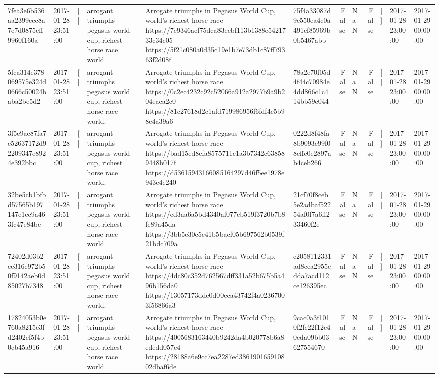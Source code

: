 \begin{tabular}{llllllrlrlll}
7fea3e6b536aa2399ccc8a7e7d0875cff9960f160a & 2017-01-28 23:51:00 & [] & arrogant triumphs pegasus world cup, richest horse race world. & Arrogate triumphs in Pegasus World Cup, world's richest horse race https://7e9346acf75dca83ecbf113b1388e5421733c34c05 https://5f21c080a0d35c19e1b7e73db1c87ff79363f2d08f & 75f4a33087d9e550ea4c0a491cf85969b0b5467abb & False & NaN & False & [] & 2017-01-28 23:00:00 & 2017-01-29 00:00:00 \\
5fca314e378069575e324d0666c50024baba2be5d2 & 2017-01-28 23:51:00 & [] & arrogant triumphs pegasus world cup, richest horse race world. & Arrogate triumphs in Pegasus World Cup, world's richest horse race https://0c2ec4232c92c52066a912a2977b9a9b204eaca2c0 https://81c27618d2c1afd719986956f6fdf4e5b98e4a39a6 & 78a2e70f05d4f44c70984e4dd866c1c414bb59e044 & False & NaN & False & [] & 2017-01-28 23:00:00 & 2017-01-29 00:00:00 \\
3f5e9ae87fa7e52637172d92209347e8924e392bbc & 2017-01-28 23:51:00 & [] & arrogant triumphs pegasus world cup, richest horse race world. & Arrogate triumphs in Pegasus World Cup, world's richest horse race https://bad15ed8efa8575711c1a3b7342c638589448b017f https://d53615943166085164297d46f5ee1978e943c4e240 & 0222d8f48fa8b9093c99f08effc0e2897ab4ceb266 & False & NaN & False & [] & 2017-01-28 23:00:00 & 2017-01-29 00:00:00 \\
32be5cb1bfbd57565b197147e1cc9a463fc47e84be & 2017-01-28 23:51:00 & [] & arrogant triumphs pegasus world cup, richest horse race world. & Arrogate triumphs in Pegasus World Cup, world's richest horse race https://ed3aa6a5bd4340af077cb519f3720b7b8fe89a45da https://3bb5c30c5c41b5bacf05b697562b0539f21bdc709a & 21cf70f8ceb5e2adbaf52254af0f7a6ff233460f2e & False & NaN & False & [] & 2017-01-28 23:00:00 & 2017-01-29 00:00:00 \\
72402d03b2ee316e972b50f9142aeb0d85027b7348 & 2017-01-28 23:51:00 & [] & arrogant triumphs pegasus world cup, richest horse race world. & Arrogate triumphs in Pegasus World Cup, world's richest horse race https://4dc80c352d762567dff331a52b675b5a496b156da0 https://13057173dde0d00eca43742f4a02367003f56866a3 & c2058112331ad8cea2955edda7acd112ce126395ec & False & NaN & False & [] & 2017-01-28 23:00:00 & 2017-01-29 00:00:00 \\
17824053b0e760a8215e3fd2402ef5f4b0cb45a916 & 2017-01-28 23:51:00 & [] & arrogant triumphs pegasus world cup, richest horse race world. & Arrogate triumphs in Pegasus World Cup, world's richest horse race https://4005683163440b9242da4b020778b6a8ededd057c4 https://28188a6e9cc7ea2287ed386190165910802dbaf6de & 9cac0a3f1010f2fc22f12c40eda09bb03627554670 & False & NaN & False & [] & 2017-01-28 23:00:00 & 2017-01-29 00:00:00 \\

\end{tabular}

